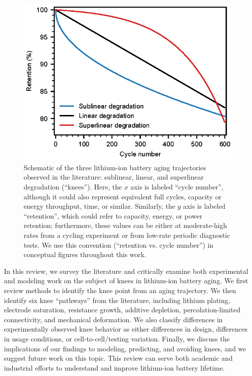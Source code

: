 \documentclass[journal=jpclcd,manuscript=article]{achemso}
\begin{document}
\begin{figure}[t]
\centering
\includegraphics[scale=1]{figures/degradation_rates.eps}
\caption{Schematic of the three lithium-ion battery aging trajectories observed in the literature: sublinear, linear, and superlinear degradation (``knees''). Here, the $x$ axis is labeled ``cycle number'', although it could also represent equivalent full cycles, capacity or energy throughput, time, or similar. Similarly, the $y$ axis is labeled ``retention'', which could refer to capacity, energy, or power retention; furthermore, these values can be either at moderate-high rates from a cycling experiment or from low-rate periodic diagnostic tests. We use this convention (``retention vs. cycle number'') in conceptual figures throughout this work.}
\label{fig:degradation_shapes}
\end{figure}

In this review, we survey the literature and critically examine both experimental and modeling work on the subject of knees in lithium-ion battery aging. We first review methods to identify the knee point from an aging trajectory. We then identify six knee ``pathways'' from the literature, including lithium plating, electrode saturation, resistance growth, additive depletion, percolation-limited connectivity, and mechanical deformation. We also classify differences in experimentally observed knee behavior as either differences in design, differences in usage conditions, or cell-to-cell/testing variation. Finally, we discuss the implications of our findings to modeling, predicting, and avoiding knees, and we suggest future work on this topic. This review can serve both academic and industrial efforts to understand and improve lithium-ion battery lifetime.
\end{document}
